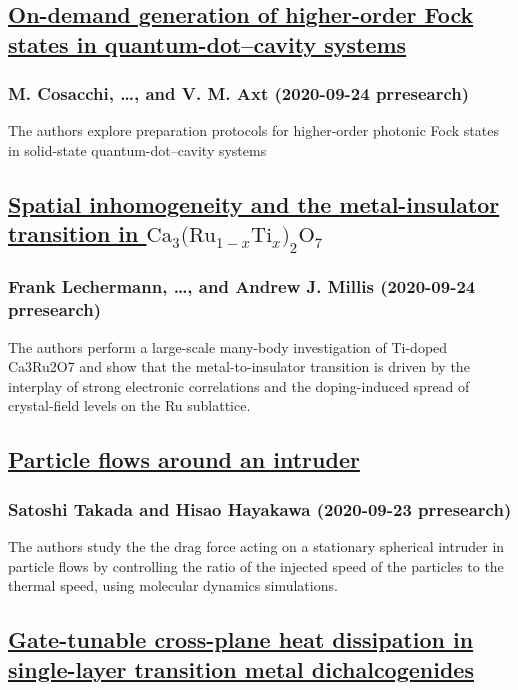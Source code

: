 \subsection*{\href{http://link.aps.org/doi/10.1103/PhysRevResearch.2.033489}{On-demand generation of higher-order Fock states in quantum-dot–cavity systems}}
\subsubsection*{M. Cosacchi, \dots, and V. M. Axt (2020-09-24 prresearch)}
The authors explore preparation protocols for higher-order photonic Fock states in solid-state quantum-dot–cavity systems
\subsection*{\href{http://link.aps.org/doi/10.1103/PhysRevResearch.2.033490}{Spatial inhomogeneity and the metal-insulator transition in ${\mathrm{Ca}}_{3}({\mathrm{Ru}}_{1−x}{\mathrm{Ti}}_{x}{)}_{2}{\mathrm{O}}_{7}$}}
\subsubsection*{Frank Lechermann, \dots, and Andrew J. Millis (2020-09-24 prresearch)}
The authors perform a large-scale many-body investigation of Ti-doped Ca3Ru2O7 and show that the metal-to-insulator transition is driven by the interplay of strong electronic correlations and the doping-induced spread of crystal-field levels on the Ru sublattice.
\subsection*{\href{http://link.aps.org/doi/10.1103/PhysRevResearch.2.033468}{Particle flows around an intruder}}
\subsubsection*{Satoshi Takada and Hisao Hayakawa (2020-09-23 prresearch)}
The authors study the the drag force acting on a stationary spherical intruder in particle flows by controlling the ratio of the injected speed of the particles to the thermal speed, using molecular dynamics simulations.
\subsection*{\href{http://link.aps.org/doi/10.1103/PhysRevResearch.2.033470}{Gate-tunable cross-plane heat dissipation in single-layer transition metal dichalcogenides}}

